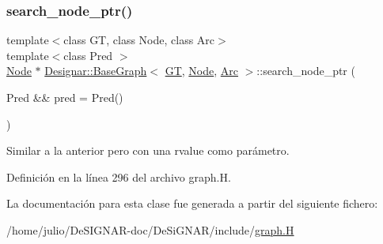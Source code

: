 \subsubsection{\texorpdfstring{search\+\_\+node\+\_\+ptr()}{search\_node\_ptr()}\hspace{0.1cm}{\footnotesize\ttfamily [2/2]}}
{\footnotesize\ttfamily template$<$class GT, class Node, class Arc$>$ \\
template$<$class Pred $>$ \\
\hyperlink{namespace_designar_a5af326c65aa2bd26b26c410f2030d09e}{Node} $\ast$ \hyperlink{class_designar_1_1_base_graph}{Designar\+::\+Base\+Graph}$<$ \hyperlink{demo-buildgraph_8_c_a3001c40d2c31ca87ed96cd7d1334a55e}{GT}, \hyperlink{namespace_designar_a5af326c65aa2bd26b26c410f2030d09e}{Node}, \hyperlink{namespace_designar_a3f55fb5513d62ff47cbc8f72b8e95d6f}{Arc} $>$\+::search\+\_\+node\+\_\+ptr (\begin{DoxyParamCaption}\item[{Pred \&\&}]{pred = {\ttfamily Pred()} }\end{DoxyParamCaption})\hspace{0.3cm}{\ttfamily [inline]}}



Similar a la anterior pero con una rvalue como parámetro. 



Definición en la línea 296 del archivo graph.\+H.



La documentación para esta clase fue generada a partir del siguiente fichero\+:\begin{DoxyCompactItemize}
\item 
/home/julio/\+De\+S\+I\+G\+N\+A\+R-\/doc/\+De\+Si\+G\+N\+A\+R/include/\hyperlink{graph_8_h}{graph.\+H}\end{DoxyCompactItemize}
